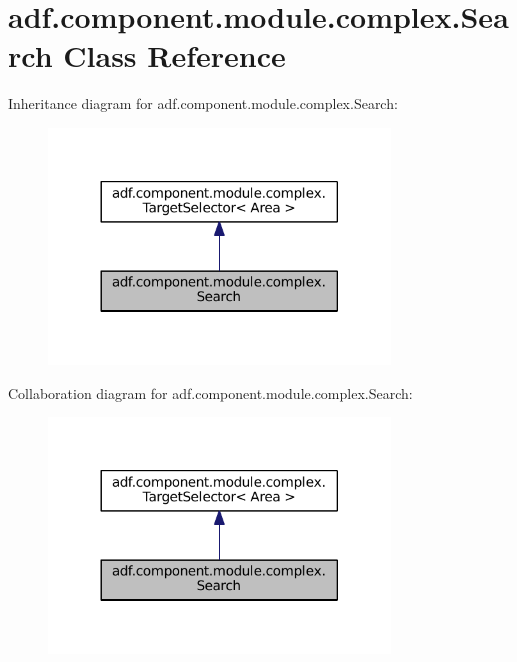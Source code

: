 \hypertarget{classadf_1_1component_1_1module_1_1complex_1_1Search}{}\section{adf.\+component.\+module.\+complex.\+Search Class Reference}
\label{classadf_1_1component_1_1module_1_1complex_1_1Search}


Inheritance diagram for adf.\+component.\+module.\+complex.\+Search\+:
\nopagebreak
\begin{figure}[H]
\begin{center}
\leavevmode
\includegraphics[width=257pt]{classadf_1_1component_1_1module_1_1complex_1_1Search__inherit__graph}
\end{center}
\end{figure}


Collaboration diagram for adf.\+component.\+module.\+complex.\+Search\+:
\nopagebreak
\begin{figure}[H]
\begin{center}
\leavevmode
\includegraphics[width=257pt]{classadf_1_1component_1_1module_1_1complex_1_1Search__coll__graph}
\end{center}
\end{figure}
